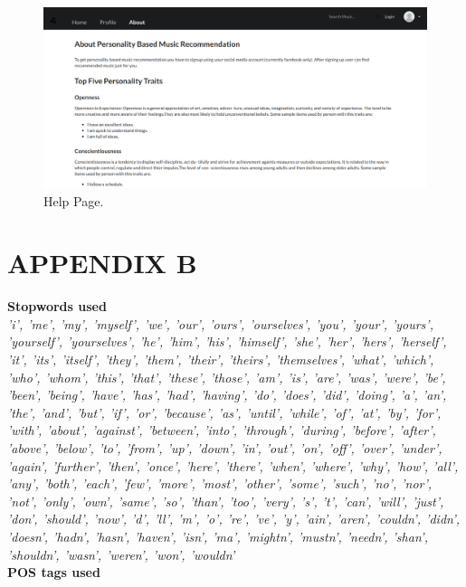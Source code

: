 \newpage
\begin{figure}[h]
  \centering
    \includegraphics[width=1\textwidth]{fig/help_screenshot.png}
    \caption{Help Page.}
\end{figure}

\newpage
\section*{APPENDIX B}
{\bf Stopwords used}\\


{\em 'i', 'me', 'my', 'myself', 'we', 'our', 'ours', 'ourselves', 'you', 'your', 'yours', 'yourself', 'yourselves', 'he', 'him', 'his', 'himself', 'she', 'her', 'hers', 'herself', 'it', 'its', 'itself', 'they', 'them', 'their', 'theirs', 'themselves', 'what', 'which', 'who', 'whom', 'this', 'that', 'these', 'those', 'am', 'is', 'are', 'was', 'were', 'be', 'been', 'being', 'have', 'has', 'had', 'having', 'do', 'does', 'did', 'doing', 'a', 'an', 'the', 'and', 'but', 'if', 'or', 'because', 'as', 'until', 'while', 'of', 'at', 'by', 'for', 'with', 'about', 'against', 'between', 'into', 'through', 'during', 'before', 'after', 'above', 'below', 'to', 'from', 'up', 'down', 'in', 'out', 'on', 'off', 'over', 'under', 'again', 'further', 'then', 'once', 'here', 'there', 'when', 'where', 'why', 'how', 'all', 'any', 'both', 'each', 'few', 'more', 'most', 'other', 'some', 'such', 'no', 'nor', 'not', 'only', 'own', 'same', 'so', 'than', 'too', 'very', 's', 't', 'can', 'will', 'just', 'don', 'should', 'now', 'd', 'll', 'm', 'o', 're', 've', 'y', 'ain', 'aren', 'couldn', 'didn', 'doesn', 'hadn', 'hasn', 'haven', 'isn', 'ma', 'mightn', 'mustn', 'needn', 'shan', 'shouldn', 'wasn', 'weren', 'won', 'wouldn'}\\


{\bf POS tags used}\\


